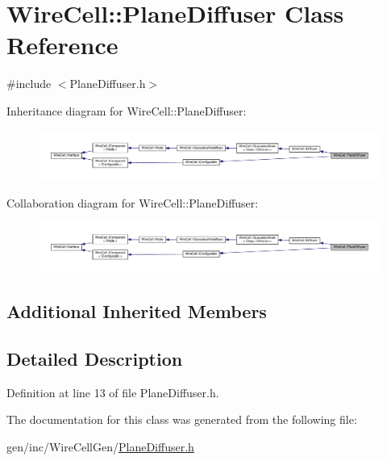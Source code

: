 \hypertarget{class_wire_cell_1_1_plane_diffuser}{}\section{Wire\+Cell\+:\+:Plane\+Diffuser Class Reference}
\label{class_wire_cell_1_1_plane_diffuser}


{\ttfamily \#include $<$Plane\+Diffuser.\+h$>$}



Inheritance diagram for Wire\+Cell\+:\+:Plane\+Diffuser\+:
\nopagebreak
\begin{figure}[H]
\begin{center}
\leavevmode
\includegraphics[width=350pt]{class_wire_cell_1_1_plane_diffuser__inherit__graph}
\end{center}
\end{figure}


Collaboration diagram for Wire\+Cell\+:\+:Plane\+Diffuser\+:
\nopagebreak
\begin{figure}[H]
\begin{center}
\leavevmode
\includegraphics[width=350pt]{class_wire_cell_1_1_plane_diffuser__coll__graph}
\end{center}
\end{figure}
\subsection*{Additional Inherited Members}


\subsection{Detailed Description}


Definition at line 13 of file Plane\+Diffuser.\+h.



The documentation for this class was generated from the following file\+:\begin{DoxyCompactItemize}
\item 
gen/inc/\+Wire\+Cell\+Gen/\hyperlink{_plane_diffuser_8h}{Plane\+Diffuser.\+h}\end{DoxyCompactItemize}
